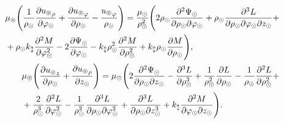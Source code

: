\begin{align}
\begin{split}
&\mu_\circledcirc\Biggl(\frac{1}{\rho_\odot}\frac{\partial {u_\circledcirc}_{\rho}}{\partial\varphi_\odot}+\frac{\partial {u_\circledcirc}_{\varphi}}{\partial \rho_\odot}-\frac{{u_\circledcirc}_{\varphi}}{\rho_\odot}\Biggr)=\frac{\mu_\odot}{\rho^2_\odot}\Biggl(2\rho_\odot\frac{\partial^2\Psi_\odot}{\partial\rho_\odot\partial\varphi_\odot}+\rho_\odot\frac{\partial^3 L}{\partial\rho_\odot\partial\varphi_\odot\partial z_\odot}+\\
&+\rho_\odot k_\updownarrow\frac{\partial^2 M}{\partial\varphi^2_\odot}-2\frac{\partial \Psi_\odot}{\partial\varphi_\odot}-k_\updownarrow \rho^2_\odot\frac{\partial^2 M}{\partial\rho^2_\odot}+k_\updownarrow\rho_\odot\frac{\partial M}{\partial\rho_\odot}\Biggr),
\end{split}\\
\begin{split}
&\mu_\circledcirc\Biggl(\frac{\partial {u_\circledcirc}_z}{\partial \rho_\odot}+\frac{\partial {u_\circledcirc}_{\rho}}{\partial z_\odot}\Biggr)=\mu_\odot\Biggl(2\frac{\partial^2\Psi_\odot}{\partial\rho_\odot\partial z_\odot}-\frac{\partial^3 L}{\partial\rho^3_\odot}+\frac1{\rho^2_\odot}\frac{\partial L}{\partial\rho_\odot}-\frac1{\rho_\odot}\frac{\partial^2 L}{\partial\rho^2_\odot}+\\
&+\frac2{\rho^3_\odot}\frac{\partial^2 L}{\partial\varphi^2_\odot}-\frac1{\rho^2_\odot}\frac{\partial^3 L}{\partial\rho_\odot\partial\varphi^2_\odot}+\frac{\partial^3 L}{\partial\rho_\odot\partial z^3_\odot}+k_\updownarrow\frac{\partial^2 M}{\partial\varphi_\odot\partial z_\odot}\Biggr).
\end{split}
\end{align}

